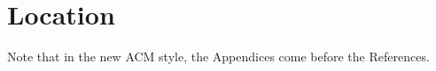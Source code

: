 \appendix

\section{Location}

Note that in the new ACM style, the Appendices come before the References.



\begin{acks}
\end{acks}
